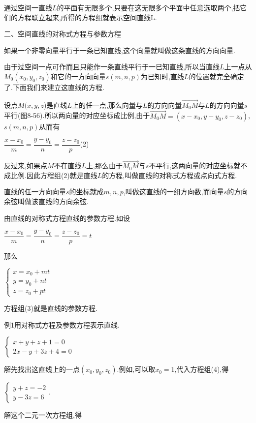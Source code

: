 \documentclass[oneside]{book}
\begin{document}
通过空间一直线$L$的平面有无限多个,只要在这无限多个平面中任意选取两个,把它们的方程联立起来,所得的方程组就表示空间直线L.

二、空间直线的对称式方程与参数方程

如果一个非零向量平行于一条已知直线,这个向量就叫做这条直线的方向向量.

由于过空间一点可作而且只能作一条直线平行于一已知直线,所以当直线$L$上一点从${M_0}({x_0},{y_0},{z_0})$和它的一方向向量$s(m,n,p)$为已知时,直线$L$的位置就完全确定了.下面我们来建立这直线的方程.

设点$M(x,y,z$)是直线$L$上的任一点,那么向量与$L$的方向向量$\overrightarrow {{M_0}M} $与$L$的方向向量$s$平行(图8-56).所以两向量的对应坐标成比例,由于$\overrightarrow {{M_0}M}  = (x - {x_0},y - {y_0},z - {z_0})$,$s(m,n,p)$从而有

$\dfrac{{x - {x_0}}}{m} = \dfrac{{y - {y_0}}}{n} = \dfrac{{z - {z_0}}}{p}$\quad (2)

反过来,如果点$M$不在直线$L$上,那么由于$\overrightarrow {{M_0}M} $与$s$不平行,这两向量的对应坐标就不成比例.因此方程组(2)就是直线$L$的方程,叫做直线的对称式方程或点向式方程.

直线的任一方向向量$s$的坐标就成$m,n,p$,叫做这直线的一组方向数,而向量$s$的方向余弦叫做该直线的方向余弦.

由直线的对称式方程直线的参数方程.如设

$\dfrac{{x - {x_0}}}{m} = \dfrac{{y - {y_0}}}{n} = \dfrac{{z - {z_0}}}{p} = t$

那么

$\left\{\begin{array}{l}{x=x_{0}+m t} \\ {y=y_{0}+n t} \\ {z=z_{0}+p t}\end{array}\right.$

方程组(3)就是直线的参数方程.

例1用对称式方程及参数方程表示直线.

$\left\{\begin{array}{l}{x+y+z+1=0} \\ {2 x-y+3 z+4=0}\end{array}\right.$

解先找出这直线上的一点$({x_0},{y_0},{z_0})$.例如,可以取${x_0} = 1$,代入方程组(4),得

$\left\{\begin{array}{l}{y+z=-2} \\ {y-3 z=6}\end{array}\right.$.

解这个二元一次方程组,得
\end{document}
